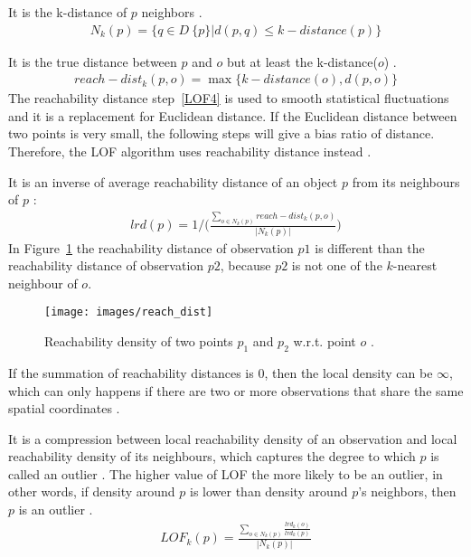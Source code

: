 \begin{defn} \label{LOF3} It is the k-distance of $p$ neighbors \citep{Markus}.
\begin{align}
\label{b}
N_{k}(p) = \lbrace q \in D \ \{p\} | d(p,q) \leq k-distance(p) \rbrace
\end{align}
\end{defn}

\begin{defn} \label{LOF4} It is the true distance between $p$ and $o$ but at least the k-distance($o$) \citep{LOF}.
\begin{align}
\label{c}
reach-dist_k(p,o) = \max \lbrace k-distance(o),d(p,o) \rbrace
\end{align}
The reachability distance step~\ref{LOF4} is used to smooth statistical fluctuations \citep{Markus} and it is a replacement for Euclidean distance. If the Euclidean distance between two points is very small, the following steps will give a bias ratio of distance. Therefore, the LOF algorithm uses reachability distance instead \citep{Mathew}. 
\end{defn}

\begin{defn} \label{LOF5} It is an inverse of average reachability distance of an object $p$ from its neighbours of $p$ \citep{LOF}:
\begin{align}
\label{d}
lrd(p) = 1/ \bigg( \frac{\sum_{o \in N_{k}(p)} reach-dist_{k}(p,o)}{|N_{k}(p)|} \bigg)  
\end{align}
In Figure~\ref{reach_dist} the reachability distance of observation $p1$ is different than the reachability distance of observation $p2$, because $p2$ is not one of the $k$-nearest neighbour of $o$.
\begin{figure}[!h]
\centering 
\texttt{[image: images/reach\_dist]}
\caption{Reachability density of two points $p_1$ and $p_2$ w.r.t. point $o$ \citep{LOF}.}
\label{reach_dist} 
\end{figure}
\end{defn} 
If the summation of reachability distances is 0, then the local density can be $\infty$, which can only happens if there are two or more observations that share the same spatial coordinates \citep{Markus}.

\begin{defn} \label{LOF6}
It is a compression between local reachability density of an observation and local reachability density of its neighbours, which captures the degree to which $p$ is called an outlier \citep{Hongyin}. The higher value of LOF the more likely to be an outlier, in other words, if density around $p$ is lower than density around $p$’s neighbors, then $p$ is an outlier \citep{Markus}.
\begin{align}
\label{e}
LOF_{k}(p) = \frac{\sum_{o \in N_{k}(p)}\frac{lrd_{k}(o)}{lrd_{k}(p)}} {|N_{k}(p)|}
\end{align}
\end{defn}

